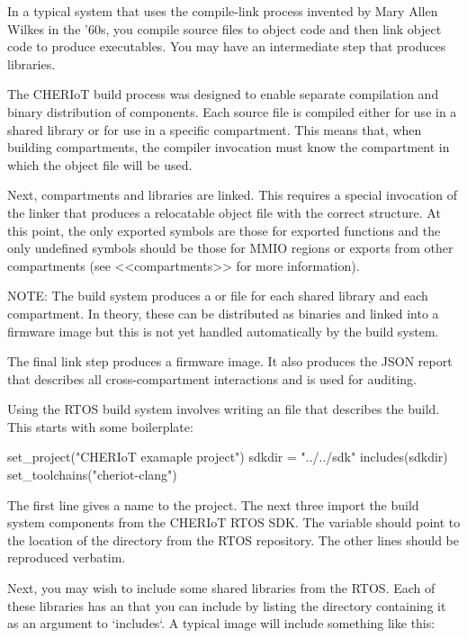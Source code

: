 In a typical system that uses the compile-link process invented by Mary Allen Wilkes in the '60s, you compile source files to object code and then link object code to produce executables.
You may have an intermediate step that produces libraries.

The CHERIoT build process was designed to enable separate compilation and binary distribution of components.
Each source file is compiled either for use in a shared library or for use in a specific compartment.
This means that, when building compartments, the compiler invocation must know the compartment in which the object file will be used.

Next, compartments and libraries are linked.
This requires a special invocation of the linker that produces a relocatable object file with the correct structure.
At this point, the only exported symbols are those for exported functions and the only undefined symbols should be those for MMIO regions or exports from other compartments (see <<compartments>> for more information).

NOTE: The build system produces a  or  file for each shared library and each compartment.
In theory, these can be distributed as binaries and linked into a firmware image but this is not yet handled automatically by the build system.

The final link step produces a firmware image.
It also produces the JSON report that describes all cross-compartment interactions and is used for auditing.

Using the RTOS build system involves writing an  file that describes the build.
This starts with some boilerplate:

\begin{luasnippet}
set_project("CHERIoT examaple project")
sdkdir = "../../sdk"
includes(sdkdir)
set_toolchains("cheriot-clang")
\end{luasnippet}

The first line gives a name to the project.
The next three import the build system components from the CHERIoT RTOS SDK.
The  variable should point to the location of the  directory from the RTOS repository.
The other lines should be reproduced verbatim.

Next, you may wish to include some shared libraries from the RTOS.
Each of these libraries has an  that you can include by listing the directory containing it as an argument to `includes`.
A typical image will include something like this:

